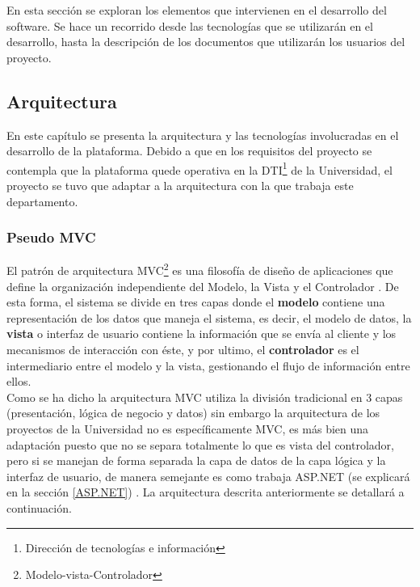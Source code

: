 En esta sección se exploran los elementos que intervienen en el desarrollo del software. Se hace un recorrido desde las tecnologías que se utilizarán en el desarrollo, hasta la descripción de los documentos que utilizarán los usuarios del proyecto.
\subsection{Arquitectura}
 
 En este capítulo se presenta la arquitectura y las tecnologías involucradas en el desarrollo de la plataforma. Debido a que en los requisitos del proyecto se contempla que la plataforma quede operativa en la  DTI\footnote{Dirección de tecnologías e información} de la Universidad, el proyecto se tuvo que adaptar a la arquitectura con la que trabaja este departamento.

\subsubsection{Pseudo MVC }

El patrón de arquitectura MVC\footnote{Modelo-vista-Controlador} es una filosofía de diseño de aplicaciones que define la organización independiente del Modelo, la Vista  y el Controlador \cite{eje15}. De esta forma, el sistema se divide en tres capas donde el \textbf{modelo}  contiene una representación de los datos que maneja el sistema, es decir, el modelo de datos, la \textbf{ vista}  o interfaz de usuario contiene la información que se envía al cliente y los mecanismos de interacción con éste, y por ultimo, el \textbf{controlador} es el intermediario entre el modelo y la vista, gestionando el flujo de información entre ellos.
\\

Como se ha dicho la arquitectura MVC utiliza la división tradicional en 3 capas (presentación, lógica de negocio y datos) sin embargo la arquitectura de los proyectos de la Universidad no es específicamente  MVC, es más bien una adaptación puesto que no se separa totalmente lo que es vista del controlador, pero si se manejan de forma separada la capa de datos de la capa lógica y la interfaz de usuario, de manera semejante es como trabaja ASP.NET (se explicará en la sección \ref{ASP.NET}) . La arquitectura descrita anteriormente se detallará a continuación.
\\

